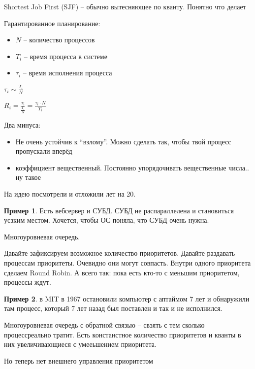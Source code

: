 \documentclass{book}
\theoremstyle{definition}
\newtheorem*{example}{Пример}
\begin{document}
Shortest Job First (SJF) -- обычно вытесняющее по кванту. Понятно что делает

Гарантированное планирование:
\begin{itemize}
    \item $N$ -- количество процессов
    \item  $T_i$ -- время процесса в системе
    \item  $\tau_i$ -- время исполнения процесса
\end{itemize}

$\tau_i \sim \frac{T_i}{N}$ 

$R_i = \frac{\tau_i}{\frac{T_i}{N}} = \frac{\tau_i\cdot N}{T_i}$ 

Два минуса:
\begin{itemize}
    \item  Не очень устойчив к ``взлому''. Можно сделать так, чтобы твой процесс пропускали вперёд
    \item коэффициент вещественный. Постоянно упорядочивать вещественные числа.. ну такое
\end{itemize}

На идею посмотрели и отложили лет на 20.

\begin{example}
    Есть вебсервер и СУБД. СУБД не распараллелена и становиться усзким местом. Хочется, чтобы ОС поняла, что СУБД очень нужна.
\end{example}

Многоуровневая очередь.

Давайте зафиксируем возможное количество приоритетов. Давайте раздавать процессам приоритеты. Очевидно они могут совпасть. Внутри одного приоритета сделаем Round Robin. А всего так: пока есть кто-то с меньшим приоритетом, процессы ждут.

\begin{example}
    в MIT в 1967 остановили компьютер с аптаймом 7 лет и обнаружили там процесс, который 7 лет назад был поставлен и так и не исполнился.
\end{example}

Многоуровневая очередь с обратной связью -- свзять с тем сколько процессреально тратит. Есть констанстное количество приоритетов и кванты в них увеличивающиеся с умееьшением приоритета.

Но теперь нет внешнего управления приоритетом
\end{document}
